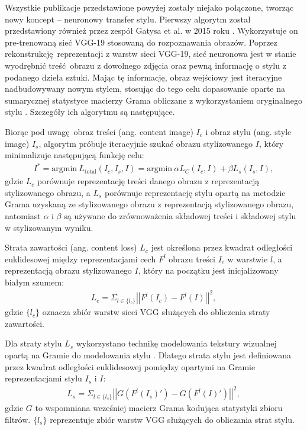 \documentclass[12pt]{article}
\begin{document}
\indent

Wszystkie publikacje przedstawione powyżej zostały niejako połączone, tworząc nowy koncept – neuronowy transfer stylu. Pierwszy algorytm został przedstawiony również przez zespół Gatysa et al. w 2015 roku \cite{19}. Wykorzystuje on pre-trenowaną sieć VGG-19 stosowaną do rozpoznawania obrazów. Poprzez rekonstrukcję reprezentacji z warstw sieci VGG-19, sieć neuronowa jest w stanie wyodrębnić treść obrazu z dowolnego zdjęcia oraz pewną informację o stylu z podanego dzieła sztuki. Mając tę informację, obraz wejściowy jest iteracyjne nadbudowywany nowym stylem, stosując do tego celu dopasowanie oparte na sumarycznej statystyce macierzy Grama obliczane z wykorzystaniem oryginalnego stylu \cite{24}. Szczegóły ich algorytmu są następujące.

Biorąc pod uwagę obraz treści (ang. content image) $I_c$ i obraz stylu (ang. style image) $I_s$, algorytm próbuje iteracyjnie szukać obrazu stylizowanego $I$, który minimalizuje następującą funkcję celu:
\begin{align*}
    I^*=\text{argmin}\ L_{\text{total}}\left(I_c,I_s,I\right) = \text{argmin}\ \alpha L_{C}\left(I_c,I\right)+\beta L_s\left(I_s,I\right),
\end{align*}
gdzie $L_c$ porównuje reprezentację treści danego obrazu z reprezentacją stylizowanego obrazu, a $L_s$ porównuje reprezentację stylu opartą na metodzie Grama uzyskaną ze stylizowanego obrazu z reprezentacją stylizowanego obrazu, natomiast $\alpha$ i $\beta$ są używane do zrównoważenia składowej treści i składowej stylu w stylizowanym wyniku.

Strata zawartości (ang. content loss) $L_c$ jest określona przez kwadrat odległości euklidesowej między reprezentacjami cech $F^l$ obrazu treści $I_c$ w warstwie $l$, a reprezentacją obrazu stylizowanego $I$, który na początku jest inicjalizowany białym szumem:
\begin{align*}
    L_c = \Sigma_{l\in \{l_c\}}\left|\left|F^l\left(I_c\right)-F^l(I)\right|\right|^2,
\end{align*}
gdzie $\{l_c\}$ oznacza zbiór warstw sieci VGG służących do obliczenia straty zawartości.

Dla straty stylu $L_s$ wykorzystano technikę modelowania tekstury wizualnej opartą na Gramie do modelowania stylu \cite{24}. Dlatego strata stylu jest definiowana przez kwadrat odległości euklidesowej pomiędzy opartymi na Gramie reprezentacjami stylu $I_s$ i $I$:
\begin{align*}
    L_s = \Sigma_{l\in \{l_s\}}\left|\left|G\left(F^l\left(I_s\right)'\right)-G\left(F^l(I)'\right)\right|\right|^2,
\end{align*}
gdzie $G$ to wspomniana wcześniej macierz Grama kodująca statystyki zbioru filtrów. $\{l_s\}$ reprezentuje zbiór warstw VGG służących do obliczania strat stylu.
\end{document}
